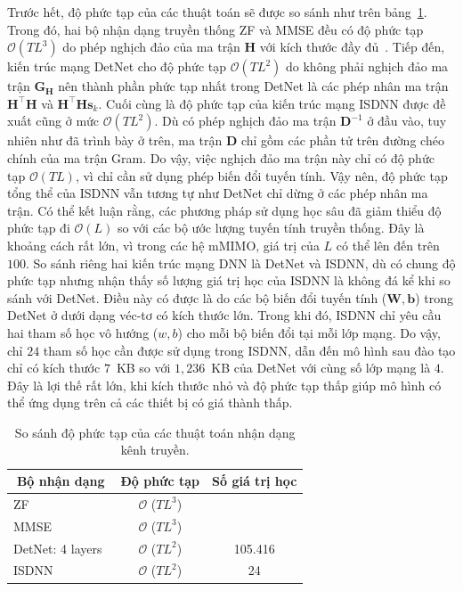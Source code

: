 Trước hết, độ phức tạp của các thuật toán sẽ được so sánh như trên bảng~\ref{tab:computational}. Trong đó, hai bộ nhận dạng truyền thống ZF và MMSE đều có độ phức tạp $\mathcal{O}(TL^3)$ do phép nghịch đảo của ma trận $\mathbf{H}$ với kích thước đầy đủ~\cite{Victor1992}. Tiếp đến, kiến trúc mạng DetNet cho độ phức tạp $\mathcal{O}(TL^2)$ do không phải nghịch đảo ma trận $\mathbf{G}_\mathbf{H}$ nên thành phần phức tạp nhất trong DetNet là các phép nhân ma trận $\mathbf{H}^\top \mathbf{H}$ và $\mathbf{H}^\top \mathbf{H} \mathbf{s}_k$. Cuối cùng là độ phức tạp của kiến trúc mạng ISDNN được đề xuất cũng ở mức $\mathcal{O}(TL^2)$. Dù có phép nghịch đảo ma trận $\mathbf{D}^{-1}$ ở đầu vào, tuy nhiên như đã trình bày ở trên, ma trận $\mathbf{D}$ chỉ gồm các phần tử trên đường chéo chính của ma trận Gram. Do vậy, việc nghịch đảo ma trận này chỉ có độ phức tạp $\mathcal{O}(TL)$, vì chỉ cần sử dụng phép biến đổi tuyến tính. Vậy nên, độ phức tạp tổng thể của ISDNN vẫn tương tự như DetNet chỉ dừng ở các phép nhân ma trận. Có thể kết luận rằng, các phương pháp sử dụng học sâu đã giảm thiểu độ phức tạp đi $\mathcal{O}(L)$ so với các bộ ước lượng tuyến tính truyền thống. Đây là khoảng cách rất lớn, vì trong các hệ mMIMO, giá trị của $L$ có thể lên đến trên $100$. So sánh riêng hai kiến trúc mạng DNN là DetNet và ISDNN, dù có chung độ phức tạp nhưng nhận thấy số lượng giá trị học của ISDNN là không đá kể khi so sánh với DetNet. Điều này có được là do các bộ biến đổi tuyến tính ($\mathbf{W}, \mathbf{b}$) trong DetNet ở dưới dạng véc-tơ có kích thước lớn. Trong khi đó, ISDNN chỉ yêu cầu hai tham số học vô hướng ($w, b$) cho mỗi bộ biến đổi tại mỗi lớp mạng. Do vậy, chỉ $24$ tham số học cần được sử dụng trong ISDNN, dẫn đến mô hình sau đào tạo chỉ có kích thước $7$~KB so với $1,236$~KB của DetNet với cùng số lớp mạng là $4$. Đây là lợi thế rất lớn, khi kích thước nhỏ và độ phức tạp thấp giúp mô hình có thể ứng dụng trên cả các thiết bị có giá thành thấp.
\begin{table}[ht]
    \centering
    \caption{So sánh độ phức tạp của các thuật toán nhận dạng kênh truyền.}
    \label{tab:computational}
    \begin{tabular}{l|c|c}
    \hline
    \hline
    \multicolumn{1}{c|}{Bộ nhận dạng} & Độ phức tạp & Số giá trị học \\ \hline
    ZF & $\mathcal{O}$ ($TL^3$) &  \\ \hline
    MMSE & $\mathcal{O}$ ($TL^3$) &  \\ \hline
    DetNet: 4 layers~\cite{Samuel2019} & $\mathcal{O}$ ($TL^2$) & 105.416 \\ \hline
    ISDNN & $\mathcal{O}$ ($TL^2$) & 24 \\ \hline
    \end{tabular}
\end{table}

